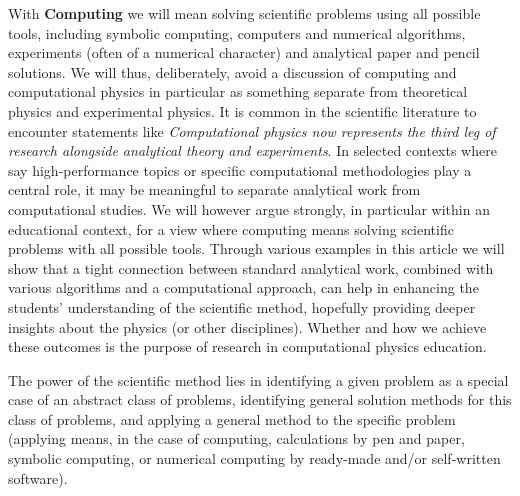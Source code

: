 \documentclass[graybox,envcountchap,sectrefs]{svmult}
\begin{document}
With \textbf{Computing } we will mean solving scientific problems
using all possible tools, including symbolic computing, computers and
numerical algorithms, experiments (often of a numerical character) and
analytical paper and pencil solutions. We will thus, deliberately,
avoid a discussion of computing and computational physics in
particular as something separate from theoretical physics and
experimental physics.  It is common in the scientific literature to
encounter statements like \emph{Computational physics now represents
  the third leg of research alongside analytical theory and
  experiments}. In selected contexts where say high-performance topics
or specific computational methodologies play a central role, it may be
meaningful to separate analytical work from computational studies. We
will however argue strongly, in particular within an educational
context, for a view where computing means solving scientific problems
with all possible tools. Through various examples in this article we
will show that a tight connection between standard analytical work,
combined with various algorithms and a computational approach, can
help in enhancing the students' understanding of the scientific
method, hopefully providing deeper insights about the physics (or
other disciplines). Whether and how we achieve these outcomes is the
purpose of research in computational physics education.

The power of the scientific method lies in identifying a given problem
as a special case of an abstract class of problems, identifying
general solution methods for this class of problems, and applying a
general method to the specific problem (applying means, in the case of
computing, calculations by pen and paper, symbolic computing, or
numerical computing  by ready-made and/or self-written software).
\end{document}
